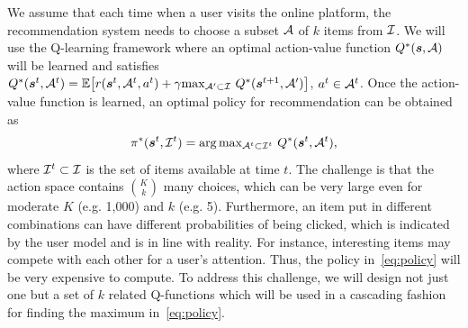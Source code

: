 \documentclass{article} %
\newcommand{\Le}[1]{{\color{red}{\bf\sf [ #1]}}}
\begin{document}
We assume that each time when a user visits the online platform, 
the recommendation system needs to choose a subset ${\mathcal{A}}$ of $k$ items from ${\mathcal{I}}$. We will use the Q-learning framework where an optimal action-value function $Q^*({\bm{s}},{\mathcal{A}})$ will be learned and satisfies $Q^*({\bm{s}}^t, {\mathcal{A}}^t) =\mathbb{E}\big[r({\bm{s}}^t, {\mathcal{A}}^t, a^t) + \gamma  {\textstyle\max_{{\mathcal{A}}'\subset {\mathcal{I}}}}~Q^*({\bm{s}}^{t+1}, {\mathcal{A}}')\big]$, $a^t \in {\mathcal{A}}^t$.  
Once the action-value function is learned, an optimal policy for recommendation can be obtained as
\begin{equation}\label{eq:policy}
	\pi^\ast({\bm{s}}^t, {\mathcal{I}}^t)=\arg{\textstyle\max_{{\mathcal{A}}^t\subset {\mathcal{I}}^t}}~Q^*({\bm{s}}^t, {\mathcal{A}}^t), 
\end{equation}
where ${\mathcal{I}}^t \subset {\mathcal{I}}$ is the set of items available at time $t$.
The challenge is that the action space contains {\small ${K \choose k}$} many choices, which can be very large even for moderate $K$ (e.g. 1,000) and $k$ (e.g. 5). Furthermore, an item put in different combinations can have different probabilities of being clicked, which is indicated by the user model and is in line with reality. For instance, interesting items may compete with each other for a user's attention. Thus, the policy in~\eqref{eq:policy} will be very expensive to compute. To address this challenge, we will design not just one but a set of $k$ related Q-functions which will be used in a cascading fashion for finding the maximum in~\eqref{eq:policy}. 
\end{document}
